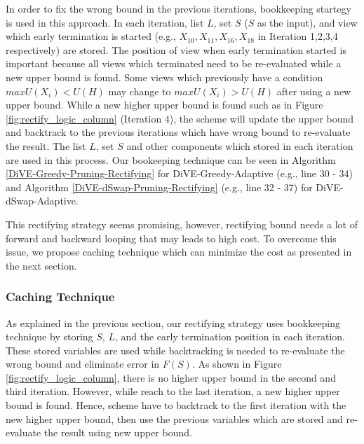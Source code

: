 \documentclass{article}
\begin{document}
In order to fix the wrong bound in the previous iterations, bookkeeping startegy is used in this approach. In each iteration, list $L$, set $S$ ($S$ as the input), and view which early termination is started (e.g., $X_{10}, X_{11}, X_{16}, X_{18}$ in Iteration 1,2,3,4 respectively) are stored. The position of view when early termination started is important because all views which terminated need to be re-evaluated while a new upper bound is found. Some views which previously have a condition $maxU(X_i) < U(H)$ may change to $maxU(X_i) > U(H)$ after using a new upper bound. While a new higher upper bound is found such as in Figure \ref{fig:rectify_logic_column} (Iteration 4), the scheme will update the upper bound and backtrack to the previous iterations which have wrong bound to re-evaluate the result. The list $L$, set $S$ and other components which stored in each iteration are used in this process. Our bookeeping technique can be seen in Algorithm \ref{DiVE-Greedy-Pruning-Rectifying} for DiVE-Greedy-Adaptive (e.g., line 30 - 34) and Algorithm \ref{DiVE-dSwap-Pruning-Rectifying} (e.g., line 32 - 37) for DiVE-dSwap-Adaptive.   


This rectifying strategy seems promising, however, rectifying bound needs a lot of forward and backward looping that may leads to high cost. To overcome this issue, we propose caching technique which can minimize the cost as presented in the next section. 

\subsubsection{Caching Technique}
As explained in the previous section, our rectifying strategy uses bookkeeping technique by storing $S$, $L$, and the early termination position in each iteration. These stored variables are used while backtracking is needed to re-evaluate the wrong bound and eliminate error in $F(S)$. As shown in Figure \ref{fig:rectify_logic_column}, there is no higher upper bound in the second and third iteration. However, while reach to the last iteration, a new higher upper bound is found. Hence, scheme have to backtrack to the first iteration with the new higher upper bound, then use the previous variables which are stored and re-evaluate the result using new upper bound.
\end{document}
